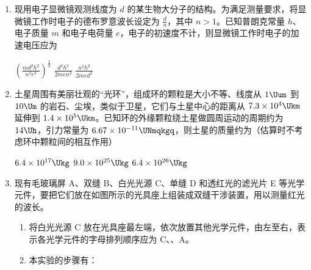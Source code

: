 \documentclass[\gkver]{gaokaozhenti}
\begin{document}
\begin{enumerate}
\item
现用电子显微镜观测线度为 $d$ 的某生物大分子的结构。为满足测量要求，将显微镜工作时电子的德布罗意波长设定为 $\frac{d}{n}$，其中 $n>1$。已知普朗克常量 $h$、电子质量 $m$ 和电子电荷量 $e$，电子的初速度不计，则显微镜工作时电子的加速电压应为

{$\left(\frac{md^{2}h^{2}}{n^{2}e^{3}}\right)^{\frac{1}{3}}$}
{$\frac{d^{2}h^{2}}{2men^{2}}$}
{$\frac{n^{2}h^{2}}{2med^{2}}$}


\item
土星周围有美丽壮观的“光环”，组成环的颗粒是大小不等、线度从 $1\Uum$ 到 $10\Um$ 的岩石、尘埃，类似于卫星，它们与土星中心的距离从 $7.3\times10^{4}\Ukm$ 延伸到 $1.4\times10^{5}\Ukm$。已知环的外缘颗粒绕土星做圆周运动的周期约为 $14\Uh$，引力常量为 $6.67\times10^{-11}\UNmqkgq$，则土星的质量约为（估算时不考虑环中颗粒间的相互作用）

{$6.4\times10^{17}\Ukg$}
{$9.0\times10^{25}\Ukg$}
{$6.4\times10^{26}\Ukg$}


\item
现有毛玻璃屏 A、双缝 B、白光光源 C、单缝 D 和透红光的滤光片 E 等光学元件，要把它们放在如图所示的光具座上组装成双缝干涉装置，用以测量红光的波长。

\begin{enumerate}
	\item
	将白光光源 C 放在光具座最左端，依次放置其他光学元件，由左至右，表示各光学元件的字母排列顺序应为 C、、A。


	\item
	本实验的步骤有：


\end{enumerate}
\end{enumerate}
\end{document}
